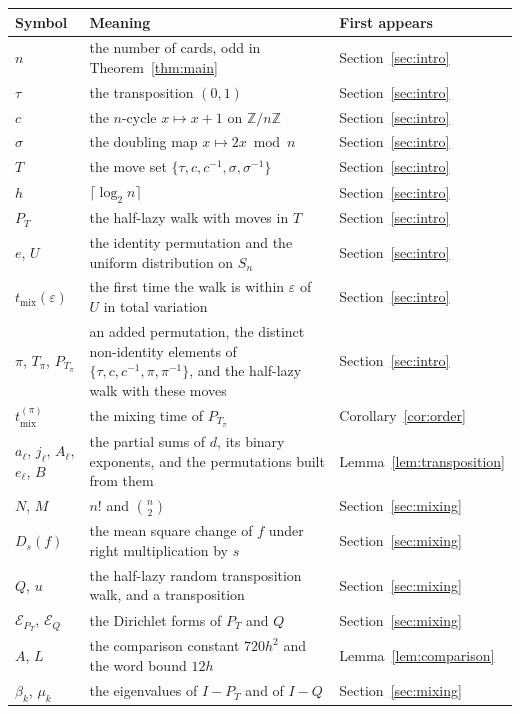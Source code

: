 \documentclass[11pt]{amsart}
\theoremstyle{remark}
\numberwithin{equation}{section}
\newcommand{\Z}{\mathbb{Z}}
\newcommand{\tmix}{t_{\mathrm{mix}}}
\newcommand{\Dir}{\mathcal{E}}
\begin{document}
\begin{center}\small
\begin{tabular}{@{}lp{}l@{}}\toprule
Symbol & Meaning & First appears \\ \midrule
$n$ & the number of cards, odd in Theorem~\ref{thm:main} & Section~\ref{sec:intro} \\
$\tau$ & the transposition $(0,1)$ & Section~\ref{sec:intro} \\
$c$ & the $n$-cycle $x\mapsto x+1$ on $\Z/n\Z$ & Section~\ref{sec:intro} \\
$\sigma$ & the doubling map $x\mapsto 2x\bmod n$ & Section~\ref{sec:intro} \\
$T$ & the move set $\{\tau,c,c^{-1},\sigma,\sigma^{-1}\}$ & Section~\ref{sec:intro} \\
$h$ & $\lceil\log_2 n\rceil$ & Section~\ref{sec:intro} \\
$P_T$ & the half-lazy walk with moves in $T$ & Section~\ref{sec:intro} \\
$e$, $U$ & the identity permutation and the uniform distribution on $S_n$ & Section~\ref{sec:intro} \\
$\tmix(\varepsilon)$ & the first time the walk is within $\varepsilon$ of $U$ in total variation & Section~\ref{sec:intro} \\
$\pi$, $T_\pi$, $P_{T_\pi}$ & an added permutation, the distinct non-identity elements of $\{\tau,c,c^{-1},\pi,\pi^{-1}\}$, and the half-lazy walk with these moves & Section~\ref{sec:intro} \\
$\tmix^{(\pi)}$ & the mixing time of $P_{T_\pi}$ & Corollary~\ref{cor:order} \\
$a_\ell$, $j_\ell$, $A_\ell$, $e_\ell$, $B$ & the partial sums of $d$, its binary exponents, and the permutations built from them & Lemma~\ref{lem:transposition} \\
$N$, $M$ & $n!$ and $\binom n2$ & Section~\ref{sec:mixing} \\
$D_s(f)$ & the mean square change of $f$ under right multiplication by $s$ & Section~\ref{sec:mixing} \\
$Q$, $u$ & the half-lazy random transposition walk, and a transposition & Section~\ref{sec:mixing} \\
$\Dir_{P_T}$, $\Dir_Q$ & the Dirichlet forms of $P_T$ and $Q$ & Section~\ref{sec:mixing} \\
$A$, $L$ & the comparison constant $720h^2$ and the word bound $12h$ & Lemma~\ref{lem:comparison} \\
$\beta_k$, $\mu_k$ & the eigenvalues of $I-P_T$ and of $I-Q$ & Section~\ref{sec:mixing} \\

\end{tabular}
\end{center}
\end{document}
